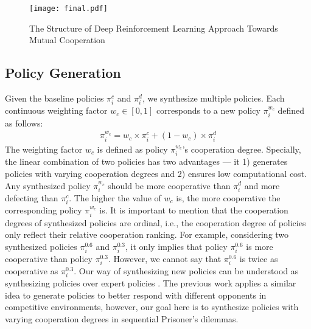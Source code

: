 \documentclass{article}
\begin{document}
\begin{figure}[t]
\texttt{[image: final.pdf]}
\caption{ The Structure of Deep Reinforcement Learning
Approach Towards Mutual Cooperation }
\label{deepStructure}
\end{figure}
\subsection{Policy Generation}
\label{policygeneration}

Given the baseline policies $\pi_i^c$ and $\pi_i^d$, we synthesize multiple policies. Each continuous weighting factor $w_c\in [0,1]$ corresponds to a new policy $\pi_i^{w_c}$ defined as follows:
\begin{eqnarray}
\label{policygenerationequation}
\pi_i^{w_c} = w_c \times \pi_i^c + (1 - w_c) \times \pi_i^d
\end{eqnarray}
The weighting factor $w_c$ is defined as policy $\pi_i^{w_c}$'s cooperation degree. Specially, the linear combination of two policies has two advantages --- it 1) generates policies with varying cooperation degrees and 2) ensures low computational cost. Any synthesized policy $\pi_i^{w_c}$ should be more cooperative than $\pi_i^d$ and more defecting than $\pi_i^c$. The higher the value of $w_c$ is, the more cooperative the corresponding policy $\pi_i^{w_c}$ is. It is important to mention that the cooperation degrees of synthesized policies are ordinal, i.e., the cooperation degree of policies only reflect their relative cooperation ranking. For example, considering two synthesized policies $\pi_i^{0.6}$ and $\pi_i^{0.3}$, it only implies that policy $\pi_i^{0.6}$ is more cooperative than policy $\pi_i^{0.3}$. However, we cannot say that $\pi_i^{0.6}$ is twice as cooperative as $\pi_i^{0.3}$. Our way of synthesizing new policies can be understood as synthesizing policies over expert policies \cite{he2016opponent}. The previous work applies a similar idea to generate policies to better respond with different opponents in competitive environments, however, our goal here is to synthesize policies with varying cooperation degrees in sequential Prisoner's dilemmas.
\end{document}
